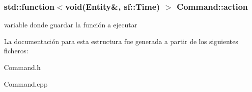 \subsubsection[{action}]{\setlength{\rightskip}{0pt plus 5cm}std\+::function$<$void({\bf Entity}\&, sf\+::\+Time) $>$ Command\+::action}\label{structCommand_ab4442395578bbfed1f3cebcb0923bec4}
variable donde guardar la función a ejecutar 

La documentación para esta estructura fue generada a partir de los siguientes ficheros\+:\begin{DoxyCompactItemize}
\item 
Command.\+h\item 
Command.\+cpp\end{DoxyCompactItemize}
